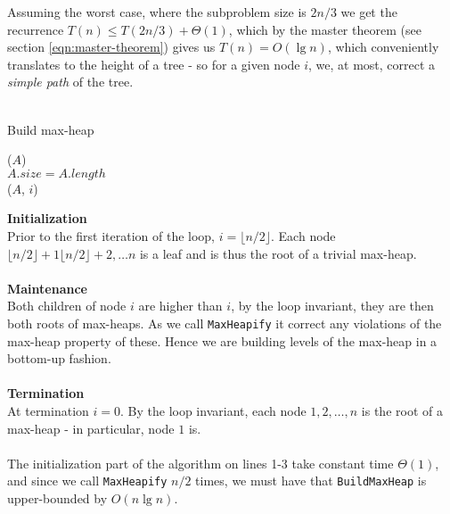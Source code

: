 Assuming the worst case, where the subproblem size is $2n/3$ we get the
recurrence $T(n) \leq T(2n/3) + \Theta(1)$, which by the master theorem (see
section \ref{eqn:master-theorem}) gives us $T(n) = O(\lg n)$, which
conveniently translates to the height of a tree - so for a given node $i$, we,
at most, correct a \textit{simple path} of the tree.
\\\\
\begin{algorithm}[H]
	\caption{Build max-heap}
	\label{alg:build-max-heap}
	
	
	
	
	
	\BlankLine
	\BuildMaxHeap($A$) \\
	\Begin
	{
		$A.size = A.length$ \\
		{
			\MaxHeapify($A$, $i$)
		}
	}
\end{algorithm}
\noindent \textbf{Initialization} \\
Prior to the first iteration of the loop, $i = \lfloor n/2 \rfloor$. Each node
$\lfloor n/2 \rfloor + 1 \lfloor n/2 \rfloor + 2, \dots n$ is a leaf and is
thus the root of a trivial max-heap.
\\\\
\noindent \textbf{Maintenance} \\
Both children of node $i$ are higher than $i$, by the loop invariant, they are
then both roots of max-heaps. As we call \texttt{MaxHeapify} it correct any
violations of the max-heap property of these. Hence we are building levels of
the max-heap in a bottom-up fashion.
\\\\
\noindent \textbf{Termination} \\
At termination $i = 0$. By the loop invariant, each node $1, 2, \dots, n$ is
the root of a max-heap - in particular, node $1$ is.
\\\\
The initialization part of the algorithm on lines 1-3 take constant time
$\Theta(1)$, and since we call \texttt{MaxHeapify} $n/2$ times, we must have
that \texttt{BuildMaxHeap} is upper-bounded by $O(n \lg n)$.


